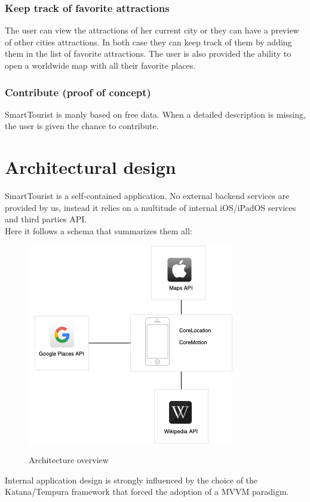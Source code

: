 \documentclass[a4paper, 11pt, parskip=half]{scrreprt}
\theoremstyle{definition}
\begin{document}
\subsection{Keep track of favorite attractions}
The user can view the attractions of her current city or they can have a preview of other cities attractions. In both case they can keep track of them by adding them in the list of favorite attractions. The user is also provided the ability to open a worldwide map with all their favorite places.

\subsection{Contribute (proof of concept)}
SmartTourist is manly based on free data. When a detailed description is missing, the user is given the chance to contribute.




\chapter{Architectural design}

SmartTourist is a self-contained application. No external backend services are provided by us, instead it relies on a multitude of internal iOS/iPadOS services and third parties API.
\\Here it follows a schema that summarizes them all:

\begin{figure}[H]
  	\centering
  	\includegraphics[width=0.5\linewidth]{ArchitectureOverview}
  	\label{fig:test1}
	\caption{Architecture overview}
\end{figure}

Internal application design is strongly influenced by the choice of the Katana/Tempura framework that forced the adoption of a MVVM paradigm.
\end{document}
